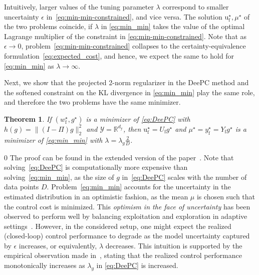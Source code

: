 \documentclass[letterpaper, 10 pt, conference]{ieeeconf}
\def\wf{w_\mathrm{f}}
\def\ufr{\mathrm{u}_\mathrm{f}}
\def\yf{y_\mathrm{f}}
\def\dy{d_\mathrm{y}}
\newtheorem{thm}{Theorem}
\def\arxiv{1} %
\begin{document}
Intuitively, larger values of the tuning parameter $\lambda$ correspond to smaller uncertainty $\epsilon$ in~\eqref{eq:min-min-constrained}, and vice versa.
The solution $\ufr^\star,\mu^\star$ of the two problems coincide, if $\lambda$ in \eqref{eq:min_min} takes the value of the optimal Lagrange multiplier of the constraint in \eqref{eq:min-min-constrained}.
Note that as $\epsilon\to0$, problem~\eqref{eq:min-min-constrained} collapses to the certainty-equivalence formulation~\eqref{eq:expected_cost}, and hence, we expect the same to hold for \eqref{eq:min_min} as $\lambda \to \infty$.


Next, we show that the projected 2-norm regularizer in the \gls{DeePC} method and the softened constraint on the \gls{KL} divergence in \eqref{eq:min_min} play the same role, and therefore the two problems have the same minimizer.
\begin{thm} \label{thm:DeePC_eqv}
If $(\wf^\star,g^\star)$ is a minimizer of \eqref{eq:DeePC} with $h(g) = \|(I-\Pi)g\|_2^2$ and $\mathcal{Y}=\mathbb{R}^{\dy}$, then $\ufr^\star = U_\mathrm{f} g^\star$ and $\mu^\star = \yf^\star = Y_\mathrm{f} g^\star$ is a minimizer of \eqref{eq:min_min} with $\lambda = \lambda_g \frac{2}{D}$.
\end{thm}
\if\arxiv0
The proof can be found in the extended version of the paper~\cite{sasfi2025gaussian}.
\fi
Note that solving~\eqref{eq:DeePC} is computationally more expensive than solving~\eqref{eq:min_min}, as the size of $g$ in~\eqref{eq:DeePC} scales with the number of data points $D$. 
Problem~\eqref{eq:min_min} accounts for the uncertainty in the estimated distribution in an optimistic fashion, as the mean $\mu$ is chosen such that the control cost is minimized.
This \textit{optimism in the face of uncertainty} has been observed to perform well by balancing exploitation and exploration in adaptive settings~\cite{abbasi2011regret,abeille2020efficient}. 
However, in the considered setup, one might expect the realized (closed-loop) control performance to degrade as the model uncertainty captured by $\epsilon$ increases, or equivalently, $\lambda$ decreases.
This intuition is supported by the empirical observation made in~\cite{dorfler2022bridging}, stating that the realized control performance monotonically increases as $\lambda_g$ in \eqref{eq:DeePC} is increased.
\end{document}
